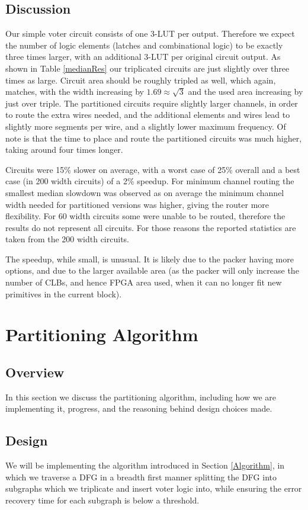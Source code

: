 \documentclass[12pt,final,oneside]{dwThesis} %
\begin{document}
\section{Discussion}
Our simple voter circuit consists of one 3-\ac{LUT} per output. Therefore we expect the number of logic elements (latches and combinational logic) to be exactly three times larger, with an additional 3-\ac{LUT} per original circuit output. As shown in Table \ref{medianRes} our triplicated circuits are just slightly over three times as large. Circuit area should be roughly tripled as well, which again, matches, with the width increasing by $1.69 \approx \sqrt{3}$ and the used area increasing by just over triple. The partitioned circuits require slightly larger channels, in order to route the extra wires needed, and the additional elements and wires lead to slightly more segments per wire, and a slightly lower maximum frequency. Of note is that the time to place and route the partitioned circuits was much higher, taking around four times longer.

Circuits were 15\% slower on average, with a worst case of 25\% overall and a best case (in 200 width circuits) of a 2\% speedup. For minimum channel routing the smallest median slowdown was observed as on average the minimum channel width needed for partitioned versions was higher, giving the router more flexibility. For 60 width circuits some were unable to be routed, therefore the results do not represent all circuits. For those reasons the reported statistics are taken from the 200 width circuits.

The speedup, while small, is unusual. It is likely due to the packer having more options, and due to the larger available area (as the packer will only increase the number of \acp{CLB}, and hence \ac{FPGA} area used, when it can no longer fit new primitives in the current block).


\chapter{Partitioning Algorithm}
\section{Overview}
In this section we discuss the partitioning algorithm, including how we are implementing it, progress, and the reasoning behind design choices made.
\section{Design}
We will be implementing the algorithm introduced in Section \ref{Algorithm}, in which we traverse a \ac{DFG} in a breadth first manner splitting the \ac{DFG} into subgraphs which we triplicate and insert voter logic into, while ensuring the error recovery time for each subgraph is below a threshold.
\end{document}
